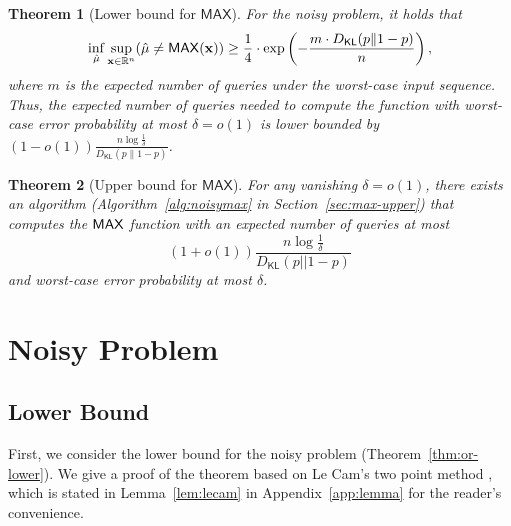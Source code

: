 \documentclass[journal, onecolumn]{IEEEtran}
\theoremstyle{plain}
\newtheorem{theorem}{Theorem}[section]
\theoremstyle{definition}
\theoremstyle{remark}
\let\P\relax
\DeclareMathOperator\P{\mathsf{P}}
\begin{document}
\begin{theorem}[Lower bound for $\mathsf{MAX}$]\label{thm:max-lower} 
    For the noisy \maxn problem, it holds that
    \begin{align*}
        \inf_{\hat\mu} \sup_{{\bf x}\in \mathbb{R}^n} \P(\hat\mu \neq \maxn({\bf x}))\geq \frac{1}{4}\cdot \exp\left(-\frac{m \cdot D_{\mathsf{KL}}(p\|1-p)}{n }\right),
    \end{align*}
    where $m$ is the expected number of queries under the worst-case input sequence. Thus, the expected number of queries needed to compute the \maxn function with worst-case error probability at most $\delta = o(1)$ is lower bounded by $(1 - o(1)) \frac{n\log \frac{1}{\delta}}{D_{\mathsf{KL}}(p \| 1-p)}$.
\end{theorem}

\begin{theorem}[Upper bound for $\mathsf{MAX}$] \label{thm:max-upper}
    For any vanishing $\delta=o(1)$, there exists an algorithm (Algorithm~\ref{alg:noisymax} in Section~\ref{sec:max-upper}) that computes the $\mathsf{MAX}$ function with an expected number of queries at most
    \[
    (1+o(1))\frac{n\log \frac{1}{\delta}}{D_\mathsf{KL}(p||1-p)}
    \]
    and worst-case error probability at most $\delta$.
\end{theorem}





\section{Noisy \orn Problem} \label{sec:or}

\subsection{Lower Bound} \label{sec:or-lower}
First, we consider the lower bound for the noisy \orn problem (Theorem~\ref{thm:or-lower}). We give a proof of the theorem based on Le Cam's two point method \citep{lecam1973convergence, yu1997assouad}, which is stated in  Lemma~\ref{lem:lecam} in Appendix~\ref{app:lemma} for the reader's convenience.
\end{document}
